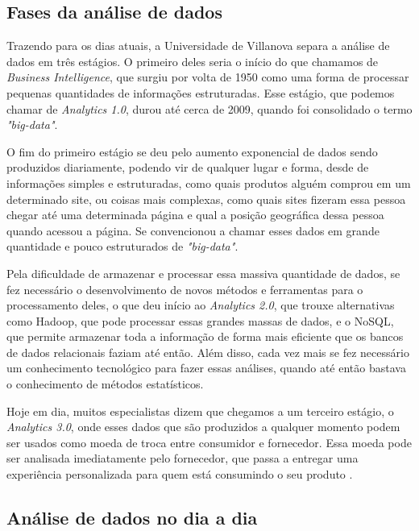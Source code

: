 \subsection{Fases da análise de dados}

\indent
\par Trazendo para os dias atuais, a Universidade de Villanova separa a análise de dados em três estágios. O primeiro deles seria o início do que chamamos de \textit{Business Intelligence}, que surgiu por volta de 1950 como uma forma de processar pequenas quantidades de informações estruturadas. Esse estágio, que podemos chamar de \textit{Analytics 1.0}, durou até cerca de 2009, quando foi consolidado o termo \textit{"big-data"}.
\par O fim do primeiro estágio se deu pelo aumento exponencial de dados sendo produzidos diariamente, podendo vir de qualquer lugar e forma, desde de informações simples e estruturadas, como quais produtos alguém comprou em um determinado site, ou coisas mais complexas, como quais sites fizeram essa pessoa chegar até uma determinada página e qual a posição geográfica dessa pessoa quando acessou a página. Se convencionou a chamar esses dados em grande quantidade e pouco estruturados de \textit{"big-data"}.
\par Pela dificuldade de armazenar e processar essa massiva quantidade de dados, se fez necessário o desenvolvimento de novos métodos e ferramentas para o processamento deles, o que deu início ao \textit{Analytics 2.0}, que trouxe alternativas como Hadoop, que pode processar essas grandes massas de dados, e o NoSQL, que permite armazenar toda a informação de forma mais eficiente que os bancos de dados relacionais faziam até então. Além disso, cada vez mais se fez necessário um conhecimento tecnológico para fazer essas análises, quando até então bastava o conhecimento de métodos estatísticos.
\par Hoje em dia, muitos especialistas dizem que chegamos a um terceiro estágio, o \textit{Analytics 3.0}, onde esses dados que são produzidos a qualquer momento podem ser usados como moeda de troca entre consumidor e fornecedor. Essa moeda pode ser analisada imediatamente pelo fornecedor, que passa a entregar uma experiência personalizada para quem está consumindo o seu produto \cite{Villanova}.

\subsection{Análise de dados no dia a dia}

